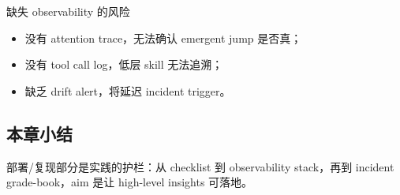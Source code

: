 \begin{warningbox}{缺失 observability 的风险}
\begin{itemize}
    \item 没有 attention trace，无法确认 emergent jump 是否真；
    \item 没有 tool call log，低层 skill 无法追溯；
    \item 缺乏 drift alert，将延迟 incident trigger。
\end{itemize}
\end{warningbox}

\subsection{本章小结}

部署/复现部分是实践的护栏：从 checklist 到 observability stack，再到 incident grade-book，aim 是让 high-level insights 可落地。

